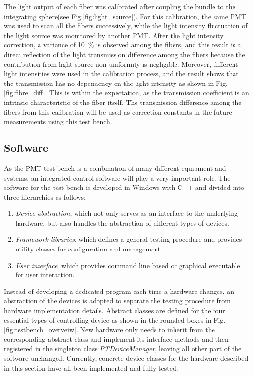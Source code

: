 \documentclass[review, times]{elsarticle}
\begin{document}
The light output of each fiber was calibrated after coupling the bundle to the integrating sphere(see Fig.\ref{fig:light_source}).
For this calibration, the same PMT was used to scan all the fibers successively, while the light intensity fluctuation of the light source was monitored by another PMT.
After the light intensity correction, a variance of \SI{10}{\percent} is observed among the fibers, and this result is a direct reflection of the light transmission difference among the fibers because the contribution from light source non-uniformity is negligible.
Moreover, different light intensities were used in the calibration process, and the result shows that the transmission has no dependency on the light intensity as shown in Fig.\ref{fig:fibre_diff}. 
This is within the expectation, as the transmission coefficient is an intrinsic characteristic of the fiber itself.
The transmission difference among the fibers from this calibration will be used as correction constants in the future measurements using this test bench.

\subsection{Software}
\label{sec:software}

As the PMT test bench is a combination of many different equipment and systems, an integrated control software will play a very important role. The software for the test bench is developed in Windows with C++ and divided into three hierarchies as follows:
\begin{enumerate}
 \item \textit{Device abstraction}, which not only serves as an interface to the underlying hardware, but also handles the abstraction of different types of devices. 
 \item \textit{Framework libraries}, which defines a general testing procedure and provides utility classes for configuration and management.
 \item \textit{User interface}, which provides command line based or graphical executable for user interaction. 
\end{enumerate}

Instead of developing a dedicated program each time a hardware changes, an abstraction of the devices is adopted to separate the testing procedure from hardware implementation details. 
Abstract classes are defined for the four essential types of controlling device as shown in the rounded boxes in Fig.\ref{fig:testbench_overveiw}.
New hardware only needs to inherit from the corresponding abstract class and implement its interface methods and then registered in the singleton class \textit{PTDeviceManager}, leaving all other part of the software unchanged.
Currently, concrete device classes for the hardware described in this section have all been implemented and fully tested.
\end{document}

